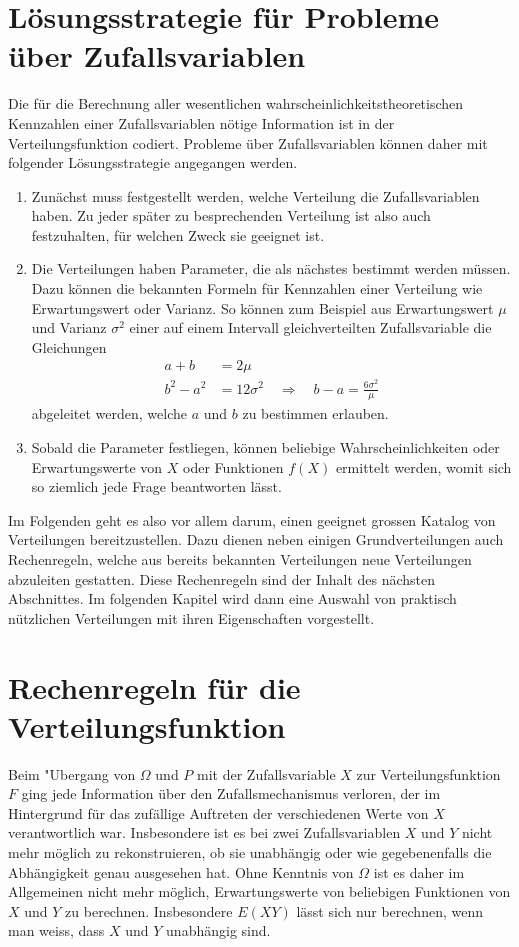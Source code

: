 \section{Lösungsstrategie für Probleme über Zufallsvariablen}
Die für die Berechnung aller wesentlichen wahrscheinlichkeitstheoretischen
Kennzahlen einer Zufallsvariablen nötige Information ist in der
Verteilungsfunktion codiert.
Probleme über Zufallsvariablen können daher mit folgender Lösungsstrategie
angegangen werden.
\begin{enumerate}
\item
Zunächst muss festgestellt werden, welche Verteilung die Zufallsvariablen
haben.
Zu jeder später zu besprechenden Verteilung ist also auch
festzuhalten, für welchen Zweck sie geeignet ist.
\item 
Die Verteilungen haben Parameter, die als nächstes bestimmt werden
müssen.
Dazu können die bekannten Formeln für Kennzahlen einer
Verteilung wie Erwartungswert oder Varianz.
So können zum Beispiel aus Erwartungswert $\mu$ und Varianz $\sigma^2$ 
einer auf einem Intervall gleichverteilten Zufallsvariable  die
Gleichungen
\begin{align*}
a+b&=2\mu\\
b^2-a^2&=12\sigma^2\quad\Rightarrow\quad b-a=\frac{6\sigma^2}{\mu}
\end{align*}
abgeleitet werden, welche $a$ und $b$ zu bestimmen erlauben.
\item
Sobald die Parameter festliegen, können beliebige Wahrscheinlichkeiten
oder Erwartungswerte von $X$ oder Funktionen $f(X)$ ermittelt werden,
womit sich so ziemlich jede Frage beantworten lässt.
\end{enumerate}
Im Folgenden geht es also vor allem darum, einen geeignet grossen
Katalog von Verteilungen bereitzustellen.
Dazu dienen neben einigen
Grundverteilungen auch Rechenregeln, welche aus bereits bekannten
Verteilungen neue Verteilungen abzuleiten gestatten.
Diese Rechenregeln
sind der Inhalt des nächsten Abschnittes.
Im folgenden Kapitel wird
dann eine Auswahl von praktisch nützlichen Verteilungen mit ihren
Eigenschaften vorgestellt.

\section{Rechenregeln für die Verteilungsfunktion}
Beim "Ubergang von $\Omega$ und $P$ mit
der Zufallsvariable $X$ zur Verteilungsfunktion $F$ 
ging jede Information
über den Zufallsmechanismus verloren, der im Hintergrund für das zufällige
Auftreten der verschiedenen Werte von $X$ verantwortlich war.
Insbesondere
ist es bei zwei Zufallsvariablen $X$ und $Y$ nicht mehr möglich zu
rekonstruieren, ob sie unabhängig oder wie gegebenenfalls die Abhängigkeit
genau ausgesehen hat.
Ohne Kenntnis von $\Omega$ ist es daher im Allgemeinen
nicht mehr möglich, Erwartungswerte von beliebigen Funktionen von $X$ und $Y$
zu berechnen.
Insbesondere $E(XY)$ lässt sich nur berechnen, wenn man weiss,
dass $X$ und $Y$ unabhängig sind.

